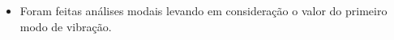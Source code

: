 \begin{itemize}



\item Foram feitas análises modais levando em consideração o valor do primeiro modo de vibração.%





\end{itemize}
